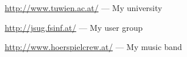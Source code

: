 
\begin{thebibliography}{99}

        \url{http://www.tuwien.ac.at/} --- My university
        
        \url{http://jsug.fsinf.at/} --- My user group
        
        \url{http://www.hoerspielcrew.at/} --- My music band
        
\end{thebibliography}
